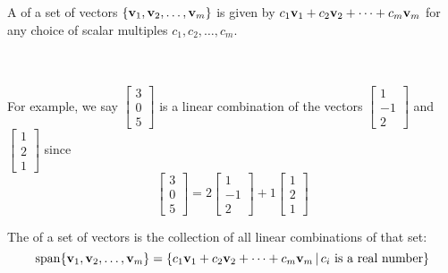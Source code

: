 \begin{applicationActivities}
\begin{activity}{10}
  \vectorSpacePropertiesO
\end{activity}

\begin{definition}
  A  of a set of vectors
  \(\{\mathbf v_1,\mathbf v_2,\dots,\mathbf v_m\}\) is given by
  \(c_1\mathbf v_1+c_2\mathbf v_2+\dots+c_m\mathbf v_m\) for any choice of
  scalar multiples \(c_1,c_2,\dots,c_m\).

	\ \\
	\ \\

  For example, we say $\begin{bmatrix}3 \\0 \\ 5\end{bmatrix}$ is a linear combination of the vectors $\begin{bmatrix} 1 \\ -1 \\ 2 \end{bmatrix}$ and $\begin{bmatrix} 1 \\ 2 \\ 1 \end{bmatrix}$ since $$\begin{bmatrix} 3 \\ 0 \\ 5 \end{bmatrix} = 2 \begin{bmatrix} 1 \\ -1 \\ 2 \end{bmatrix} + 1\begin{bmatrix} 1 \\ 2 \\ 1 \end{bmatrix}$$
\end{definition}

\begin{definition}
  The  of a set of vectors is the collection of all linear
  combinations of that set:
  \[
    \operatorname{span}\{\mathbf v_1,\mathbf v_2,\dots,\mathbf v_m\} =
    \left\{c_1\mathbf v_1+c_2\mathbf v_2+\dots+c_m\mathbf v_m\,\middle|\, 
    c_i\text{ is a real number}\right\}
  \]
\end{definition}


\end{applicationActivities}
